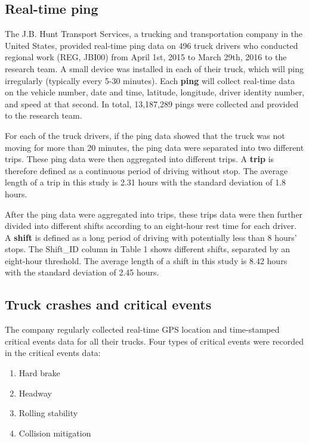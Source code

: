 \documentclass[12pt]{book}
\numberwithin{equation}{chapter}
\providecommand{\tightlist}{%
  \setlength{\itemsep}{0pt}\setlength{\parskip}{0pt}}
\begin{document}
\hypertarget{real-time-ping}{%
\subsection{Real-time ping}\label{real-time-ping}}

The J.B. Hunt Transport Services, a trucking and transportation company in the United States,
provided real-time ping data on 496 truck drivers who conducted regional work (REG, JBI00) from April 1st, 2015 to March 29th, 2016 to the research team.
A small device was installed in each of their truck, which will ping irregularly (typically every 5-30 minutes).
Each \textbf{ping} will collect real-time data on the vehicle number, date and time, latitude, longitude, driver identity number, and speed at that second.
In total, 13,187,289 pings were collected and provided to the research team.

For each of the truck drivers, if the ping data showed that the truck was not moving for more than 20 minutes, the ping data were separated into two different trips.
These ping data were then aggregated into different trips.
A \textbf{trip} is therefore defined as a continuous period of driving without stop.
The average length of a trip in this study is 2.31 hours with the standard deviation of 1.8 hours.

After the ping data were aggregated into trips, these trips data were then further divided into different shifts according to an eight-hour rest time for each driver.
A \textbf{shift} is defined as a long period of driving with potentially less than 8 hours' stops.
The Shift\_ID column in Table 1 shows different shifts, separated by an eight-hour threshold.
The average length of a shift in this study is 8.42 hours with the standard deviation of 2.45 hours.

\hypertarget{truck-crashes-and-critical-events}{%
\subsection{Truck crashes and critical events}\label{truck-crashes-and-critical-events}}

The company regularly collected real-time GPS location and time-stamped critical events data for all their trucks.
Four types of critical events were recorded in the critical events data:

\begin{enumerate}
\def\labelenumi{\arabic{enumi}.}
\tightlist
\item
  Hard brake
\item
  Headway
\item
  Rolling stability
\item
  Collision mitigation
\end{enumerate}
\end{document}
